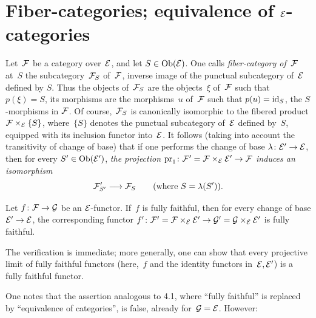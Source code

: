\section[Fiber-categories]{Fiber-categories; equivalence of
$\cal{E}$-categories}
\label{VI.4}

Let~$\cal{F}$ be a category over~$\cal{E}$, and let $S \in
\Ob({\cal{E}})$. One calls \emph{fiber-category of}~$\cal{F}$
at~$S$
the subcategory~$\cal{F}_S$
of~$\cal{F}$, inverse image of the
punctual subcategory of~$\cal{E}$ defined by $S$. Thus
the objects of~$\cal{F}_S$ are the objects~$\xi$ of~$\cal{F}$ such that
$p(\xi)=S$, its morphisms are the morphisms~$u$ of~$\cal{F}$ such
that $p(u)=\id_S$, \ie the $S$-morphisms in $\cal{F}$. Of
course,~$\cal{F}_S$ is canonically isomorphic to the fibered product
$\cal{F} \times_{\cal{E}} \{S\}$, where~$\{S\}$ denotes the
punctual subcategory of~$\cal{E}$ defined by~$S$, equipped
with its inclusion functor into~$\cal{E}$. It follows (taking
into account the transitivity of change of base) that if one performs the
change of base $\lambda\colon \cal{E}' \to \cal{E}$, then for
every $S' \in \Ob(\cal{E}')$, \emph{the projection $\pr_1\colon
\cal{F}' = \cal{F} \times_{\cal{E}} \cal{E}' \to \cal{F}$ induces an
isomorphism}
$$
\cal{F}'_{S'} \to \cal{F}_S \qquad (\text{where $S=\lambda(S')$}).
$$

\begin{proposition}
\label{VI.4.1} Let $f\colon \cal{F} \to \cal{G}$ be an
$\cal{E}$-functor. If~$f$ is fully faithful, then for every
change of base $\cal{E}' \to \cal{E}$, the corresponding functor
$f' \colon \cal{F}' = \cal{F} \times_{\cal{E}} \cal{E}' \to\allowbreak \cal{G}' =
\cal{G} \times_{\cal{E}} \cal{E}'$ is fully faithful.
\end{proposition}

The verification is immediate; more generally, one
can show that every projective limit of
fully faithful functors
(here,~$f$ and the identity functors
in~$\cal{E},\cal{E}'$) is a fully faithful functor.

One notes that the assertion analogous to 4.1,
where
``fully faithful'' is replaced by ``equivalence
of categories'', is false, already for~$\cal{G}=\cal{E}$.
However:

